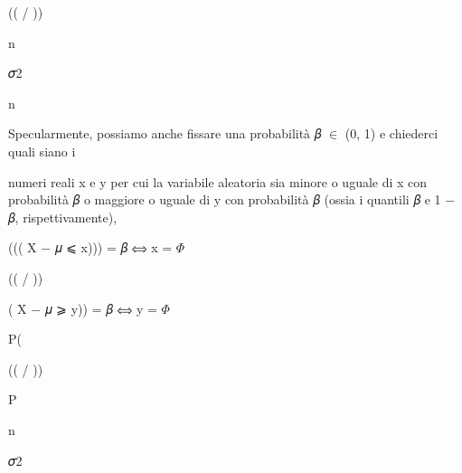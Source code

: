 \documentclass[a4paper,portrait,12pt]{article}
\begin{document}
(( / ))


\begin{flushleft}
n
\end{flushleft}





\begin{flushleft}
𝜎2
\end{flushleft}





\begin{flushleft}
n
\end{flushleft}





\begin{flushleft}
Specularmente, possiamo anche fissare una probabilit\`{a} 𝛽 $\in$ (0, 1) e chiederci quali siano i
\end{flushleft}


\begin{flushleft}
numeri reali x e y per cui la variabile aleatoria sia minore o uguale di x con probabilit\`{a} 𝛽 o maggiore o uguale di y con probabilit\`{a} 𝛽 (ossia i quantili 𝛽 e 1 $-$ 𝛽, rispettivamente),
\end{flushleft}





\begin{flushleft}
((( X $-$ 𝜇 ⩽ x))) = 𝛽 ⟺ x = $\Phi$
\end{flushleft}


(( / ))


\begin{flushleft}
( X $-$ 𝜇 ⩾ y)) = 𝛽 ⟺ y = $\Phi$
\end{flushleft}


\begin{flushleft}
P(
\end{flushleft}


(( / ))


\begin{flushleft}
P
\end{flushleft}





\begin{flushleft}
n
\end{flushleft}





\begin{flushleft}
𝜎2
\end{flushleft}
\end{document}
